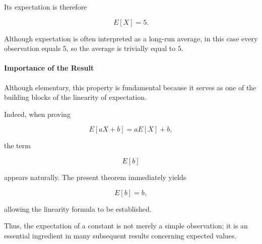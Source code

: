 \documentclass[11pt]{article}
\begin{document}
\begin{mdframed}[
		linewidth=0.8pt,
		roundcorner=6pt,
		backgroundcolor=gray!5,
		linecolor=gray!60,
		innertopmargin=10pt,
		innerbottommargin=10pt,
		innerleftmargin=10pt,
		innerrightmargin=10pt
		]
		Its expectation is therefore
		
		\[
		E[X]=5.
		\]
		
		Although expectation is often interpreted as a long-run average, in this
		case every observation equals \(5\), so the average is trivially equal to
		\(5\).
		
		\bigskip
		
		\paragraph{Importance of the Result}
		
		Although elementary, this property is fundamental because it serves as one
		of the building blocks of the linearity of expectation.
		
		Indeed, when proving
		
		\[
		E[aX+b]
		=
		aE[X]+b,
		\]
		
		the term
		
		\[
		E[b]
		\]
		
		appears naturally. The present theorem immediately yields
		
		\[
		E[b]=b,
		\]
		
		allowing the linearity formula to be established.
		
		Thus, the expectation of a constant is not merely a simple observation; it
		is an essential ingredient in many subsequent results concerning expected
		values.
		
	\end{mdframed}
	
\end{document}
